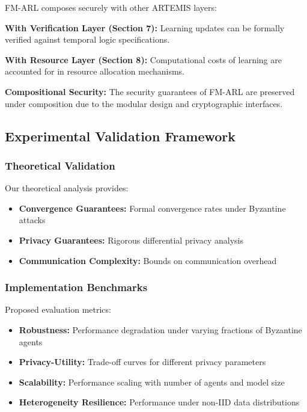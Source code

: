 \documentclass[conference]{IEEEtran}
\begin{document}
FM-ARL composes securely with other ARTEMIS layers:

\textbf{With Verification Layer (Section 7):} Learning updates can be formally verified against temporal logic specifications.

\textbf{With Resource Layer (Section 8):} Computational costs of learning are accounted for in resource allocation mechanisms.

\textbf{Compositional Security:} The security guarantees of FM-ARL are preserved under composition due to the modular design and cryptographic interfaces.

\subsection{Experimental Validation Framework}

\subsubsection{Theoretical Validation}

Our theoretical analysis provides:
\begin{itemize}
    \item \textbf{Convergence Guarantees:} Formal convergence rates under Byzantine attacks
    \item \textbf{Privacy Guarantees:} Rigorous differential privacy analysis
    \item \textbf{Communication Complexity:} Bounds on communication overhead
\end{itemize}

\subsubsection{Implementation Benchmarks}

Proposed evaluation metrics:
\begin{itemize}
    \item \textbf{Robustness:} Performance degradation under varying fractions of Byzantine agents
    \item \textbf{Privacy-Utility:} Trade-off curves for different privacy parameters
    \item \textbf{Scalability:} Performance scaling with number of agents and model size
    \item \textbf{Heterogeneity Resilience:} Performance under non-IID data distributions
\end{itemize}
\end{document}
